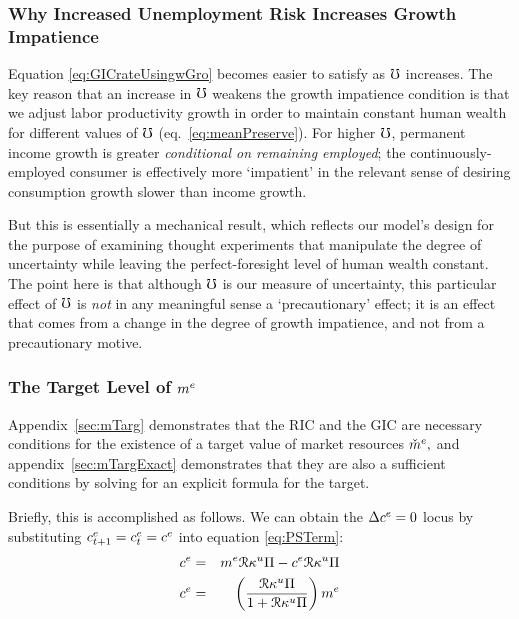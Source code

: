 \message{ !name(TractableBufferStock.tex)}\documentclass{handout}
\begin{document}
\subsubsection{Why Increased Unemployment Risk Increases Growth
  Impatience}

Equation \eqref{eq:GICrateUsingwGro} becomes easier to satisfy as $\mho$ increases.  The key reason that an increase in $\mho$ weakens the growth impatience condition is that we adjust labor productivity growth in
order to maintain constant human wealth for different values of
$\mho$ (eq.\ \eqref{eq:meanPreserve}).  For higher
$\mho$, permanent income growth is greater {\it conditional on
  remaining employed}; the continuously-employed consumer is effectively
more `impatient' in the relevant sense of desiring consumption growth
slower than income growth.

But this is essentially a mechanical result, which reflects our
model's design for the purpose of examining thought experiments that
manipulate the degree of uncertainty while leaving the
perfect-foresight level of human wealth constant.  The point here is that
although $\mho$ is our measure of uncertainty, this particular
effect of $\mho$ is {\it not} in any meaningful sense a
`precautionary' effect; it is an effect that comes from a change in the degree of 
growth impatience, and not from a precautionary motive.





\subsubsection{The Target Level of $m^{e}$}
\renewcommand{\tSS}{\null}

Appendix~\ref{sec:mTarg} demonstrates that the RIC and the GIC are necessary conditions for the existence of a target value of market resources $\check{m}^{e},$ and appendix~\ref{sec:mTargExact} demonstrates that they are also a sufficient conditions by solving for an explicit formula for the target.

Briefly, this is accomplished as follows.  We can obtain the $\Delta c^{e}=0$ locus by substituting
$c^{e}_{t+1}=c^{e}_{t}=c^{e}$ into equation \eqref{eq:PSTerm}:
\begin{eqnarray}
  \cRatE_{\tSS} & = & \mRatE_{\tSS} \Rnorm\MPCU\straight - \cRatE_{\tSS} \Rnorm\MPCU\straight
\\  \cRatE_{\tSS} & = & \left(\frac{\Rnorm\MPCU\straight}{1+\Rnorm\MPCU\straight}\right)\mRatE
 \label{eq:DceEq0} \label{eq:cDelEqZero}
\end{eqnarray}
\end{document}
